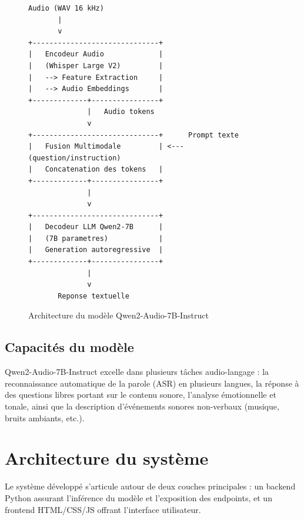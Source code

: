\documentclass[12pt,a4paper]{report}
\begin{document}
\begin{figure}[h]
\centering
\begin{Verbatim}[frame=single, rulecolor=\color{accent}, fontsize=\small]
Audio (WAV 16 kHz)
       |
       v
+------------------------------+
|   Encodeur Audio             |
|   (Whisper Large V2)         |
|   --> Feature Extraction     |
|   --> Audio Embeddings       |
+-------------+----------------+
              |   Audio tokens
              v
+------------------------------+      Prompt texte
|   Fusion Multimodale         | <--- (question/instruction)
|   Concatenation des tokens   |
+-------------+----------------+
              |
              v
+------------------------------+
|   Decodeur LLM Qwen2-7B      |
|   (7B parametres)            |
|   Generation autoregressive  |
+-------------+----------------+
              |
              v
       Reponse textuelle
\end{Verbatim}
\caption{Architecture du modèle Qwen2-Audio-7B-Instruct}
\end{figure}

\subsection{Capacités du modèle}

Qwen2-Audio-7B-Instruct excelle dans plusieurs tâches audio-langage : la reconnaissance
automatique de la parole (ASR) en plusieurs langues, la réponse à des questions libres
portant sur le contenu sonore, l'analyse émotionnelle et tonale, ainsi que la description
d'événements sonores non-verbaux (musique, bruits ambiants, etc.).

\section{Architecture du système}

Le système développé s'articule autour de deux couches principales : un backend Python
assurant l'inférence du modèle et l'exposition des endpoints, et un frontend HTML/CSS/JS
offrant l'interface utilisateur.
\end{document}
